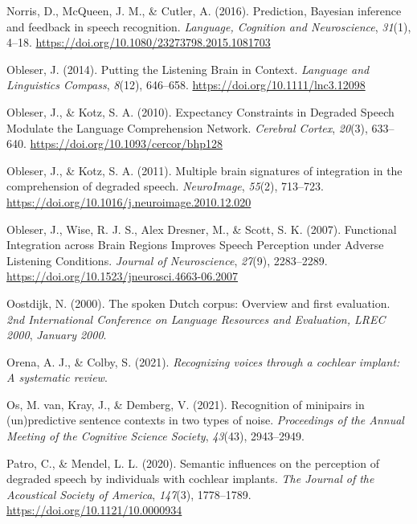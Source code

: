 \documentclass[a4paper, nobind]{templates/ociamthesis}
\newlength{\cslhangindent}
\newenvironment{CSLReferences}[2] %
 {%
  \setlength{\parindent}{0pt}
  \ifodd #1
  \let\oldpar\par
  \def\par{\hangindent=\cslhangindent\oldpar}
  \fi
  \setlength{\parskip}{1mm}
  \setlength{\baselineskip}{6mm}
 }%
 {}
\begin{document}
\begin{CSLReferences}{1}{0}
\leavevmode{}%
Norris, D., McQueen, J. M., \& Cutler, A. (2016). {Prediction, Bayesian inference and feedback in speech recognition}. \emph{Language, Cognition and Neuroscience}, \emph{31}(1), 4--18. \url{https://doi.org/10.1080/23273798.2015.1081703}

\leavevmode{}%
Obleser, J. (2014). Putting the Listening Brain in Context. \emph{Language and Linguistics Compass}, \emph{8}(12), 646--658. \url{https://doi.org/10.1111/lnc3.12098}

\leavevmode{}%
Obleser, J., \& Kotz, S. A. (2010). Expectancy Constraints in Degraded Speech Modulate the Language Comprehension Network. \emph{Cerebral Cortex}, \emph{20}(3), 633--640. \url{https://doi.org/10.1093/cercor/bhp128}

\leavevmode{}%
Obleser, J., \& Kotz, S. A. (2011). Multiple brain signatures of integration in the comprehension of degraded speech. \emph{NeuroImage}, \emph{55}(2), 713--723. \url{https://doi.org/10.1016/j.neuroimage.2010.12.020}

\leavevmode{}%
Obleser, J., Wise, R. J. S., Alex Dresner, M., \& Scott, S. K. (2007). Functional Integration across Brain Regions Improves Speech Perception under Adverse Listening Conditions. \emph{Journal of Neuroscience}, \emph{27}(9), 2283--2289. \url{https://doi.org/10.1523/jneurosci.4663-06.2007}

\leavevmode{}%
Oostdijk, N. (2000). {The spoken Dutch corpus: Overview and first evaluation}. \emph{2nd International Conference on Language Resources and Evaluation, LREC 2000}, \emph{January 2000}.

\leavevmode{}%
Orena, A. J., \& Colby, S. (2021). \emph{Recognizing voices through a cochlear implant: A systematic review}.

\leavevmode{}%
Os, M. van, Kray, J., \& Demberg, V. (2021). {Recognition of minipairs in (un)predictive sentence contexts in two types of noise}. \emph{Proceedings of the Annual Meeting of the Cognitive Science Society}, \emph{43}(43), 2943--2949.

\leavevmode{}%
Patro, C., \& Mendel, L. L. (2020). Semantic influences on the perception of degraded speech by individuals with cochlear implants. \emph{The Journal of the Acoustical Society of America}, \emph{147}(3), 1778--1789. \url{https://doi.org/10.1121/10.0000934}


\end{CSLReferences}
\end{document}
